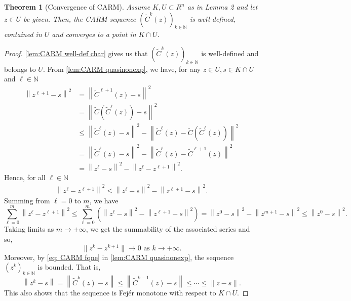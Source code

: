 \documentclass[smallextended,numbook,nospthms]{svjour3}
\theoremstyle{plain}
\newtheorem{theorem}{Theorem}[section]
\theoremstyle{definition}
\def\NN{\mathds N}
\begin{document}
\begin{theorem}[Convergence of CARM]\label{thm:CARM conv}
	Assume $K, U \subset R^{n}$ as in Lemma 2 and let $z \in U$ be given. Then, the CARM sequence $\left(\tilde{C}^{k}(z)\right)_{k \in \NN}$ is well-defined, contained in $U$ and converges to a point in $K \cap U$.
\end{theorem}
\begin{proof}
	 \cref{lem:CARM well-def char} gives us that $\left(\tilde{C}^{k}(z)\right)_{k \in \NN}$ is well-defined and belongs to $U$. From  \cref{lem:CARM quasinonexp}, we have, for any $z \in U, s \in K \cap U$ and $\ell \in \NN$
	\begin{align}
		\left\|z^{\ell+1}-s\right\|^{2} &=\left\|\tilde{C}^{\ell+1}(z)-s\right\|^{2} \\
		&=\left\|\tilde{C}\left(\tilde{C}^{\ell}(z)\right)-s\right\|^{2} \\
		& \leq\left\|\tilde{C}^{\ell}(z)-s\right\|^{2}-\left\|\tilde{C}^{\ell}(z)-\tilde{C}\left(\tilde{C}^{\ell}(z)\right)\right\|^{2} \\
		&=\left\|\tilde{C}^{\ell}(z)-s\right\|^{2}-\left\|\tilde{C}^{\ell}(z)-\tilde{C}^{\ell+1}(z)\right\|^{2} \\
		&=\left\|z^{\ell}-s\right\|^{2}-\left\|z^{\ell}-z^{\ell+1}\right\|^{2}.
	\end{align}
	Hence, for all $\ell \in \NN$
	\begin{align}
		\left\|z^{\ell}-z^{\ell+1}\right\|^{2} \leq\left\|z^{\ell}-s\right\|^{2}-\left\|z^{\ell+1}-s\right\|^{2}.
	\end{align} 
	Summing from $\ell=0$ to $m$, we have
	\begin{equation}
		\sum_{\ell=0}^{m}\left\|z^{\ell}-z^{\ell+1}\right\|^{2} \leq \sum_{\ell=0}^{m}\left(\left\|z^{\ell}-s\right\|^{2}-\left\|z^{\ell+1}-s\right\|^{2}\right)=\left\|z^{0}-s\right\|^{2}-\left\|z^{m+1}-s\right\|^{2} \leq\left\|z^{0}-s\right\|^{2}.
	\end{equation}
	Taking limits as $m \rightarrow+\infty$, we get the summability of the associated series and so, 	
	\begin{equation}\label{eq:CARM conv eq 1}
		\|z^{k}-z^{k+1}\| \rightarrow 0 \text{ as } k \rightarrow+\infty.
	\end{equation}
	Moreover, by \cref{eq: CARM fqne} in  \cref{lem:CARM quasinonexp}, the sequence $\left(z^{k}\right)_{k \in \NN}$ is bounded. That is,
	\begin{equation}
		\left\|z^{k}-s\right\| = \left\|\tilde{C}^{k}(z)-s\right\| \leq\left\|\tilde{C}^{k-1}(z)-s\right\| \leq \cdots \leq\|z-s\|.
	\end{equation}
	This also shows that the sequence is Fejér monotone with respect to $K \cap U$.
	

\end{proof}
\end{document}
